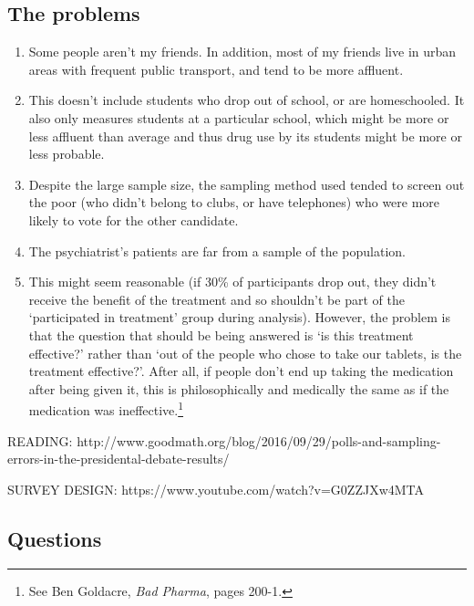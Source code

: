 \subsection*{The problems}
\begin{enumerate}
  \item Some people aren't my friends. In addition, most of my friends live in urban areas with frequent public transport,
        and tend to be more affluent.
  \item This doesn't include students who drop out of school, or are homeschooled. It also only measures students at
        a particular school, which might be more or less affluent than average and thus drug use by its students might be more or less
        probable.
  \item Despite the large sample size, the sampling method used tended to screen out the poor (who didn't belong to clubs, or
        have telephones) who were more likely to vote for the other candidate.
  \item The psychiatrist's patients are far from a sample of the population.
  \item This might seem reasonable (if 30\% of participants drop out, they didn't receive the benefit of the treatment and so
        shouldn't be part of the `participated in treatment' group during analysis). However, the problem is that the question
        that should be being answered is `is this treatment effective?' rather than `out of the people who chose to take our
        tablets, is the treatment effective?'. After all, if people don't end up taking the medication after being given it,
        this is philosophically and medically the same as if the medication was ineffective.\footnote{See Ben Goldacre, \emph{Bad Pharma}, pages 200-1.}
\end{enumerate}

READING: http://www.goodmath.org/blog/2016/09/29/polls-and-sampling-errors-in-the-presidental-debate-results/

SURVEY DESIGN: https://www.youtube.com/watch?v=G0ZZJXw4MTA


\subsection*{Questions}



